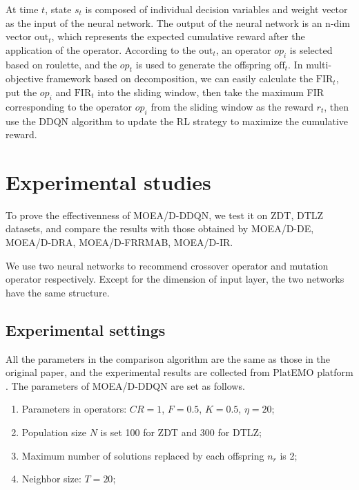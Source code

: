 \documentclass[journal]{IEEEtran}
\begin{document}
At time $t$, state $s_t$ is composed of individual decision variables and weight vector as the input of the neural network. The output of the neural network is an n-dim vector $\text{out}_t$, which represents the expected cumulative reward after the application of the operator.
According to the $\text{out}_t$, an operator $op_i$ is selected based on roulette, and the $op_t$ is used to generate the offspring $\text{off}_t$. In multi-objective framework based on decomposition, we can easily calculate the $\text{FIR}_t$, put the $op_i$ and $\text{FIR}_t$ into the sliding window, then take the maximum FIR corresponding to the operator $op_i$ from the sliding window as the reward $r_t$, then use the DDQN algorithm to update the RL strategy to maximize the cumulative reward.



\section{Experimental studies}
To prove the effectivenness of MOEA/D-DDQN, we test it on ZDT, DTLZ datasets, and compare the results with those obtained by MOEA/D-DE, MOEA/D-DRA, MOEA/D-FRRMAB, MOEA/D-IR.

We use two neural networks to recommend crossover operator and mutation operator respectively. Except for the dimension of input layer, the two networks have the same structure.

\subsection{Experimental settings}
All the parameters in the comparison algorithm are the same as those in the original paper, and the experimental results are collected from PlatEMO platform \cite{PlatEMO}.
The parameters of MOEA/D-DDQN are set as follows.
\begin{enumerate}
  \item Parameters in operators: $CR=1$, $F=0.5$, $K=0.5$, $\eta=20$;
  \item Population size $N$ is set 100 for ZDT and 300 for DTLZ;
  \item Maximum number of solutions replaced by each offspring $n_r$ is 2;
  \item Neighbor size: $T=20$;
\end{enumerate}
\end{document}
